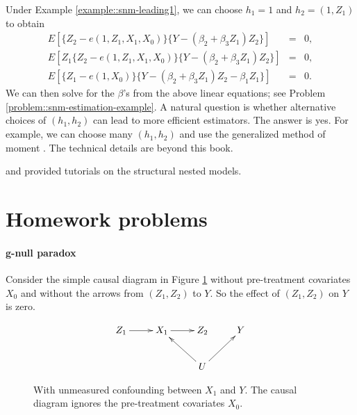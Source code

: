\begin{example}
\label{example::g-estimation-snm}
Under Example \ref{example::snm-leading1}, we can choose $h_1 = 1$ and $h_2 = (1,Z_1)$ to obtain
 \begin{eqnarray*}
 E\left[    \{ Z_2 - e(1, Z_1, X_1, X_0)  \}  \{Y-  (\beta_2 + \beta_3 Z_1  ) Z_2\}   \right] &=& 0,
\\
 E\left[   Z_1 \{ Z_2 - e(1, Z_1, X_1, X_0)  \}  \{Y-  (\beta_2 + \beta_3 Z_1  ) Z_2\}   \right] &=& 0,
 \\
 E\left[    \{  Z_1 - e(1, X_0) \}  \{Y- (\beta_2 + \beta_3 Z_1  ) Z_2 - \beta_1  Z_1 \}  \right] &=& 0 . 
 \end{eqnarray*}
 We can then solve for the $\beta$'s from the above linear equations; see Problem \ref{problem::snm-estimation-example}. A natural question is whether alternative choices of $(h_1, h_2)$ can lead to more efficient estimators. The answer is yes. For example, we can choose many $(h_1, h_2)$ and use the generalized method of moment \citep{hansen1982large}.  The technical details are beyond this book.  
\end{example}

 
\citet{naimi2017introduction} and \citet{vansteelandt2014structural} provided tutorials on the structural nested models. 
 
  
  
\section{Homework problems}

\paragraph{g-null paradox}\label{problem::g-null-paradox}


Consider the simple causal diagram in Figure \ref{fig::si-g-null-paradox} without pre-treatment covariates $X_0$ and without the arrows from $(Z_1, Z_2)$ to $Y$. So the effect of $(Z_1,Z_2)$ on $Y$ is zero.

\begin{figure}
\bigskip 
$$
 \xymatrix{
 Z_1 \ar[r]   & X_1   \ar[r]  & Z_2  & Y \\
                                             &                                             &U\ar[lu]\ar[ru]
 }
 $$
 \caption{With unmeasured confounding between $X_1$ and $Y$. The causal diagram ignores the pre-treatment covariates $X_0$.}\label{fig::si-g-null-paradox}
\end{figure}



